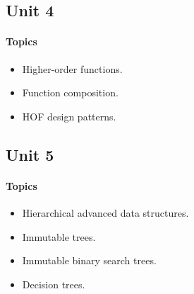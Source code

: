 \subsection*{Unit 4}
\paragraph*{Topics}			
\begin{itemize}[noitemsep]
  \item Higher-order functions.
  \item Function composition.
  \item HOF design patterns.
\end{itemize}

\subsection*{Unit 5}
\paragraph*{Topics}
\begin{itemize}[noitemsep]
  \item Hierarchical advanced data structures.
  \item Immutable trees.
  \item Immutable binary search trees.
  \item Decision trees.
\end{itemize}
